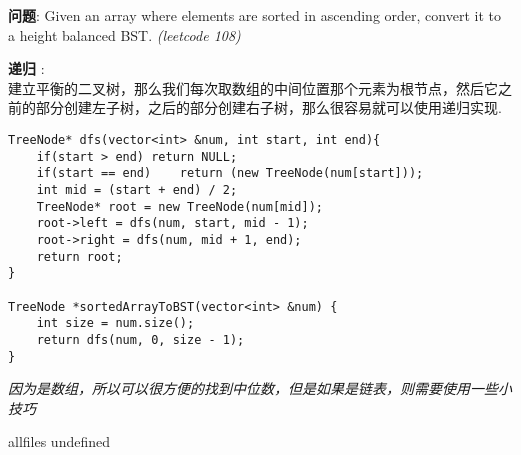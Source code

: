 \documentclass{article}
\begin{document}
\begin{CJK}{UTF8}{gbsn}     %

\else
	
\begin{description}
	\item{\textbf{问题}}: Given an array where elements are sorted in ascending order, convert it to a height balanced BST. \textit{(leetcode 108)}
	\item{\textbf{递归}} : 
	\\建立平衡的二叉树，那么我们每次取数组的中间位置那个元素为根节点，然后它之前的部分创建左子树，之后的部分创建右子树，那么很容易就可以使用递归实现.
	\begin{lstlisting}
TreeNode* dfs(vector<int> &num, int start, int end){
	if(start > end)	return NULL;
	if(start == end)	return (new TreeNode(num[start]));
	int mid = (start + end) / 2;
	TreeNode* root = new TreeNode(num[mid]);
	root->left = dfs(num, start, mid - 1);
	root->right = dfs(num, mid + 1, end);
	return root;
}

TreeNode *sortedArrayToBST(vector<int> &num) {	
	int size = num.size();
	return dfs(num, 0, size - 1);
}
	\end{lstlisting}
	\textit{因为是数组，所以可以很方便的找到中位数，但是如果是链表，则需要使用一些小技巧}
\end{description}

\fi

\ifx allfiles undefined
\end{CJK}
\end{document}
